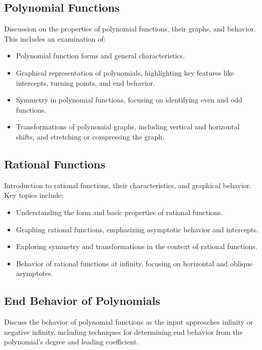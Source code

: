 \documentclass[a4paper,12pt]{book}
\begin{document}
\subsection{Polynomial Functions}
\label{subsec:polynomial_functions}
Discussion on the properties of polynomial functions, their graphs, and behavior. This includes an examination of:


\begin{itemize}
    \item Polynomial function forms and general characteristics.
    \item Graphical representation of polynomials, highlighting key features like intercepts, turning points, and end behavior.
    \item Symmetry in polynomial functions, focusing on identifying even and odd functions.
    \item Transformations of polynomial graphs, including vertical and horizontal shifts, and stretching or compressing the graph.
\end{itemize}


\subsection{Rational Functions}
\label{subsec:rational_functions}
Introduction to rational functions, their characteristics, and graphical behavior. Key topics include:


\begin{itemize}
    \item Understanding the form and basic properties of rational functions.
    \item Graphing rational functions, emphasizing asymptotic behavior and intercepts.
    \item Exploring symmetry and transformations in the context of rational functions.
    \item Behavior of rational functions at infinity, focusing on horizontal and oblique asymptotes.
\end{itemize}


\subsection{End Behavior of Polynomials}
\label{subsec:end_behavior_polynomials}
Discuss the behavior of polynomial functions as the input approaches infinity or negative infinity, including techniques for determining end behavior from the polynomial's degree and leading coefficient.
\end{document}
